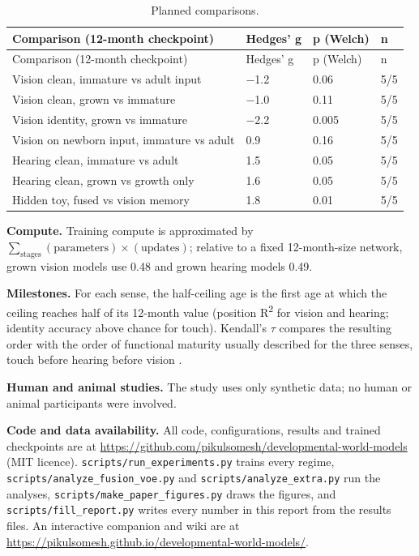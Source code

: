 \documentclass{article}
\begin{document}
\begin{longtable}[]{@{}llll@{}}
\caption{Planned comparisons.}\tabularnewline
\toprule\noalign{}
Comparison (12-month checkpoint) & Hedges' g & p (Welch) & n \\
\midrule\noalign{}
\endfirsthead
\toprule\noalign{}
Comparison (12-month checkpoint) & Hedges' g & p (Welch) & n \\
\midrule\noalign{}
\endhead
\bottomrule\noalign{}
\endlastfoot
Vision clean, immature vs adult input & \ensuremath{-}1.2 & 0.06 & 5/5 \\
Vision clean, grown vs immature & \ensuremath{-}1.0 & 0.11 & 5/5 \\
Vision identity, grown vs immature & \ensuremath{-}2.2 & 0.005 & 5/5 \\
Vision on newborn input, immature vs adult & 0.9 & 0.16 & 5/5 \\
Hearing clean, immature vs adult & 1.5 & 0.05 & 5/5 \\
Hearing clean, grown vs growth only & 1.6 & 0.05 & 5/5 \\
Hidden toy, fused vs vision memory & 1.8 & 0.01 & 5/5 \\
\end{longtable}

\textbf{Compute.} Training compute is approximated by \(\sum_{\text{stages}}(\text{parameters})\times(\text{updates})\); relative to a fixed 12-month-size network, grown vision models use 0.48 and grown hearing models 0.49.

\textbf{Milestones.} For each sense, the half-ceiling age is the first age at which the ceiling reaches half of its 12-month value (position R\textsuperscript{2} for vision and hearing; identity accuracy above chance for touch). Kendall's \ensuremath{\tau} compares the resulting order with the order of functional maturity usually described for the three senses, touch before hearing before vision \autocite{turkewitz1982limitations}.

\textbf{Human and animal studies.} The study uses only synthetic data; no human or animal participants were involved.

\textbf{Code and data availability.} All code, configurations, results and trained checkpoints are at \url{https://github.com/pikulsomesh/developmental-world-models} (MIT licence). \texttt{scripts/run\_experiments.py} trains every regime, \texttt{scripts/analyze\_fusion\_voe.py} and \texttt{scripts/analyze\_extra.py} run the analyses, \texttt{scripts/make\_paper\_figures.py} draws the figures, and \texttt{scripts/fill\_report.py} writes every number in this report from the results files. An interactive companion and wiki are at \url{https://pikulsomesh.github.io/developmental-world-models/}.
\end{document}
